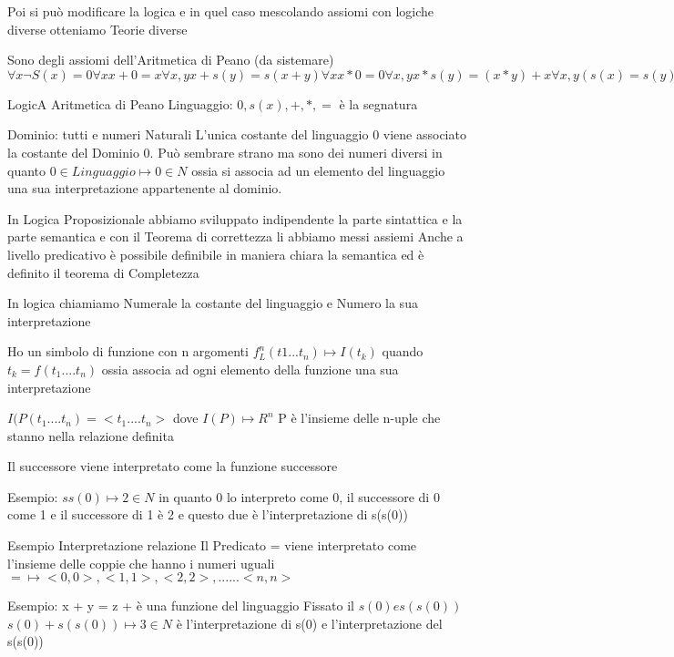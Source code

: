 Poi si può modificare la logica e in quel caso mescolando assiomi con logiche diverse otteniamo Teorie diverse

Sono degli assiomi dell'Aritmetica di Peano (da sistemare)
$\forall x \neg S(x) = 0
\forall x x + 0 = x
\forall x,y x + s(y) = s(x + y)
\forall x x * 0 = 0
\forall x,y x * s(y) = (x * y) + x
\forall x,y (s(x) = s(y)) \rightarrow x = y
P(0)
\neg D(0)
\forall x (P(x) \rightarrow \neg P(s(x))) P indica i numeri Pari
\forall x (D(x) \rightarrow \neg D(S(x))) D indica i numeri Dispari $

LogicA Aritmetica di Peano
Linguaggio: $0,s(x),+,*,=$ è la segnatura

Dominio: tutti e numeri Naturali
L'unica costante del linguaggio $0$ viene associato la costante del Dominio $0$.
 Può sembrare strano ma sono dei numeri diversi in quanto $0 \in Linguaggio \mapsto 0 \in N$
  ossia si associa ad un elemento del linguaggio una sua interpretazione appartenente al dominio.

In Logica Proposizionale abbiamo sviluppato indipendente la parte sintattica e la parte semantica
 e con il Teorema di correttezza li abbiamo messi assiemi
Anche a livello predicativo è possibile definibile in maniera chiara la semantica
 ed è definito il teorema di Completezza

In logica chiamiamo Numerale la costante del linguaggio e Numero la sua interpretazione

Ho un simbolo di funzione con n argomenti $f ^ n _L(t1...t_n) \mapsto I(t_k)$
quando $t_k = f(t_1....t_n)$ ossia associa ad ogni elemento della funzione una sua interpretazione

$I(P(t_1....t_n) = <t_1....t_n> $ dove $I(P) \mapsto R ^n$ P è l'insieme delle n-uple che stanno nella relazione definita

Il successore viene interpretato come la funzione successore

Esempio:
$s s(0) \mapsto 2 \in N$ in quanto 0 lo interpreto come 0, il successore di 0 come 1 e il successore di 1 è 2 e questo due è l'interpretazione di s(s(0))

Esempio Interpretazione relazione
Il Predicato = viene interpretato come l'insieme delle coppie che hanno i numeri uguali
$= \mapsto <0,0>,<1,1>,<2,2>,......<n,n>$

Esempio:
x + y = z    + è una funzione del linguaggio
Fissato il $s(0) e s(s(0))$
$s(0) + s(s(0)) \mapsto 3 \in N$ è l'interpretazione di s(0) e l'interpretazione del s(s(0))
